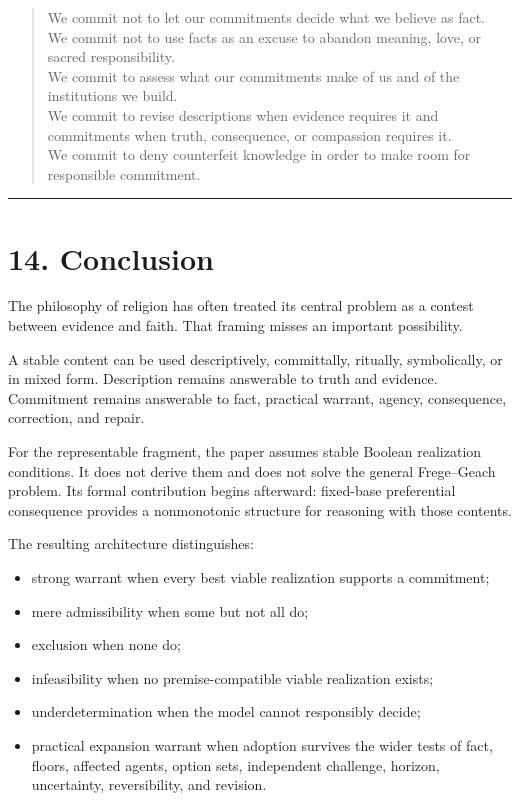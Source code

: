\documentclass[
  11pt,
]{article}
\providecommand{\tightlist}{%
  \setlength{\itemsep}{0pt}\setlength{\parskip}{0pt}}
\begin{document}
\begin{quote}
We commit not to let our commitments decide what we believe as fact.\\
We commit not to use facts as an excuse to abandon meaning, love, or
sacred responsibility.\\
We commit to assess what our commitments make of us and of the
institutions we build.\\
We commit to revise descriptions when evidence requires it and
commitments when truth, consequence, or compassion requires it.\\
We commit to deny counterfeit knowledge in order to make room for
responsible commitment.
\end{quote}

\begin{center}\rule{0.5\linewidth}{0.5pt}\end{center}

\section{14. Conclusion}\label{conclusion}

The philosophy of religion has often treated its central problem as a
contest between evidence and faith. That framing misses an important
possibility.

A stable content can be used descriptively, committally, ritually,
symbolically, or in mixed form. Description remains answerable to truth
and evidence. Commitment remains answerable to fact, practical warrant,
agency, consequence, correction, and repair.

For the representable fragment, the paper assumes stable Boolean
realization conditions. It does not derive them and does not solve the
general Frege--Geach problem. Its formal contribution begins afterward:
fixed-base preferential consequence provides a nonmonotonic structure
for reasoning with those contents.

The resulting architecture distinguishes:

\begin{itemize}
\tightlist
\item
  strong warrant when every best viable realization supports a
  commitment;
\item
  mere admissibility when some but not all do;
\item
  exclusion when none do;
\item
  infeasibility when no premise-compatible viable realization exists;
\item
  underdetermination when the model cannot responsibly decide;
\item
  practical expansion warrant when adoption survives the wider tests of
  fact, floors, affected agents, option sets, independent challenge,
  horizon, uncertainty, reversibility, and revision.
\end{itemize}
\end{document}
